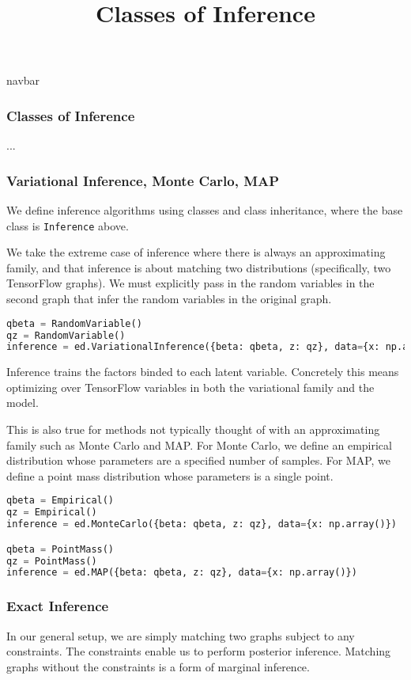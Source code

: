 \title{Classes of Inference}

{{navbar}}

\subsubsection{Classes of Inference}

...

\subsubsection{Variational Inference, Monte Carlo, MAP}

We define inference algorithms using classes and class inheritance,
where the base class is \texttt{Inference} above.

We take the extreme case of inference where there is always an
approximating family, and that inference is about matching two
distributions (specifically, two TensorFlow graphs).
We must explicitly pass in the random variables in the second
graph that infer the random variables in the original graph.
\begin{lstlisting}[language=Python]
qbeta = RandomVariable()
qz = RandomVariable()
inference = ed.VariationalInference({beta: qbeta, z: qz}, data={x: np.array()})
\end{lstlisting}
Inference trains the factors binded to each latent
variable. Concretely this means optimizing over TensorFlow variables
in both the variational family and the model.

This is also true for methods not typically thought of with an
approximating family such as Monte Carlo and MAP. For Monte Carlo, we
define an empirical distribution whose parameters are a specified
number of samples. For MAP, we define a point mass distribution whose
parameters is a single point.
\begin{lstlisting}[language=Python]
qbeta = Empirical()
qz = Empirical()
inference = ed.MonteCarlo({beta: qbeta, z: qz}, data={x: np.array()})

qbeta = PointMass()
qz = PointMass()
inference = ed.MAP({beta: qbeta, z: qz}, data={x: np.array()})
\end{lstlisting}

\subsubsection{Exact Inference}

In our general setup, we are simply matching two graphs subject to any
constraints. The constraints enable us to perform posterior inference.
Matching graphs without the constraints is a form of marginal
inference.

